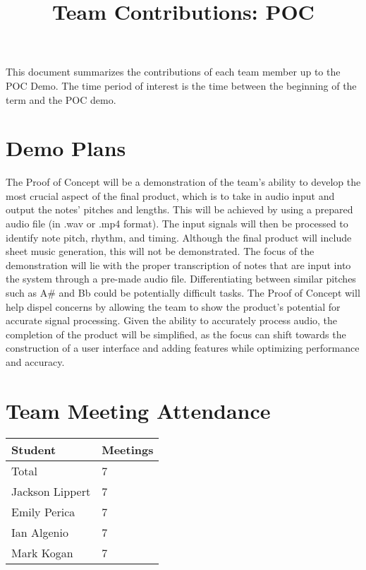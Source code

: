 \documentclass{article}
\title{Team Contributions: POC\\\progname}
\author{\authname}
\date{}
\begin{document}
\maketitle

This document summarizes the contributions of each team member up to the POC
Demo.  The time period of interest is the time between the beginning of the term
and the POC demo.

\section{Demo Plans}

The Proof of Concept will be a demonstration of the team’s ability to develop the 
most crucial aspect of the final product, which is to take in audio input and output 
the notes’ pitches and lengths. This will be achieved by using a prepared audio file (in 
.wav or .mp4 format). The input signals will then be processed to identify note pitch, rhythm, 
and timing. Although the final product will include sheet music generation, this will not be 
demonstrated. The focus of the demonstration will lie with the proper transcription of notes that 
are input into the system through a pre-made audio file. Differentiating between similar pitches 
such as A\# and Bb could be potentially difficult tasks. The Proof of Concept will help dispel concerns 
by allowing the team to show the product's potential for accurate signal processing. Given the ability 
to accurately process audio, the completion of the product will be simplified, as the focus can 
shift towards the construction of a user interface and adding features while optimizing performance and accuracy.

\section{Team Meeting Attendance}

\begin{table}[H]
\centering
\begin{tabular}{ll}
\toprule
\textbf{Student} & \textbf{Meetings}\\
\midrule
Total & 7\\
Jackson Lippert & 7\\
Emily Perica & 7\\
Ian Algenio & 7\\
Mark Kogan & 7\\
\bottomrule
\end{tabular}
\end{table}
\end{document}
